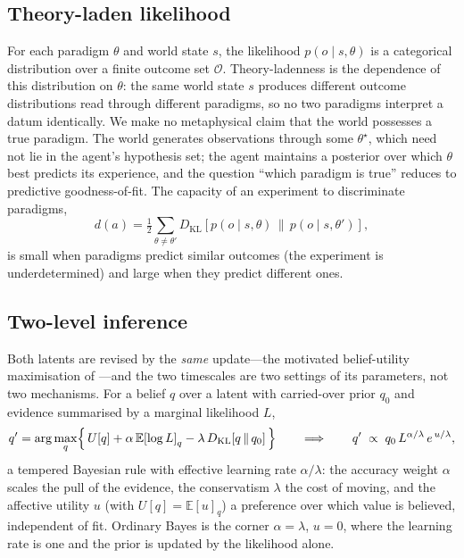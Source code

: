 \documentclass[11pt,a4paper]{article}
\newcommand{\theory}{\theta}
\newcommand{\tstar}{\theta^{\star}}
\newcommand{\qb}{q}
\newcommand{\KL}[2]{D_{\mathrm{KL}}\!\left[#1\,\|\,#2\right]}
\newcommand{\E}[1]{\mathbb{E}\!\left[#1\right]}
\begin{document}
\subsection{Theory-laden likelihood}
\label{ssec:like}

For each paradigm $\theory$ and world state $s$, the likelihood
$p(o\mid s,\theory)$ is a categorical distribution over a finite outcome set
$\mathcal O$. Theory-ladenness is the dependence of this distribution on $\theory$:
the same world state $s$ produces different outcome distributions read through
different paradigms, so no two paradigms interpret a datum identically. We make no
metaphysical claim that the world possesses a true paradigm. The world generates
observations through some $\tstar$, which need not lie in the agent's hypothesis
set; the agent maintains a posterior over which $\theory$ best predicts its
experience, and the question ``which paradigm is true'' reduces to predictive
goodness-of-fit. The capacity of an experiment to discriminate paradigms,
\begin{equation}
d(a)=\tfrac12\!\sum_{\theory\neq\theory'}\!
   \KL{p(o\mid s,\theory)}{p(o\mid s,\theory')},
\label{eq:discrim}
\end{equation}
is small when paradigms predict similar outcomes (the experiment is
underdetermined) and large when they predict different ones.

\subsection{Two-level inference}
\label{ssec:infer}

Both latents are revised by the \emph{same} update---the motivated belief-utility
maximisation of \citet{hylandAlbarracin2025MindChange}---and the two timescales are
two settings of its parameters, not two mechanisms. For a belief $\qb$ over a latent
with carried-over prior $q_0$ and evidence summarised by a marginal likelihood $L$,
\begin{equation}
q'=\arg\max_{\qb}\Bigl\{\,U[\qb]+\alpha\,\E{\log L}_{\qb}-\lambda\,\KL{\qb}{q_0}\,\Bigr\}
\qquad\Longrightarrow\qquad
q'\;\propto\;q_0\,L^{\alpha/\lambda}\,e^{\,u/\lambda},
\label{eq:motiv}
\end{equation}
a tempered Bayesian rule with effective learning rate $\alpha/\lambda$: the accuracy
weight $\alpha$ scales the pull of the evidence, the conservatism $\lambda$ the cost
of moving, and the affective utility $u$ (with $U[\qb]=\E{u}_{\qb}$) a preference
over which value is believed, independent of fit. Ordinary Bayes is the corner
$\alpha=\lambda$, $u=0$, where the learning rate is one and the prior is updated by
the likelihood alone.
\end{document}
